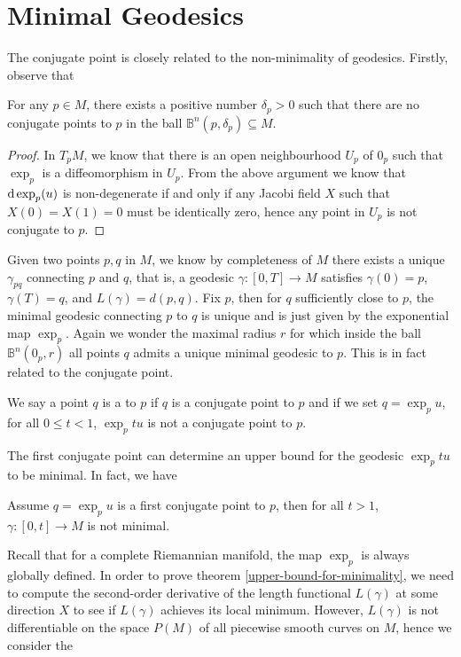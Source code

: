 \section{Minimal Geodesics} The conjugate point is closely related to the non-minimality of geodesics. Firstly, observe that
\begin{prp}
For any $p\in M$, there exists a positive number $\delta_p >0$ such that there are no conjugate points to $p$ in the ball $\mathbb{B}^n (p,\delta_p )\subseteq M$.
\end{prp}
\begin{proof}
In $T_p M$, we know that there is an open neighbourhood $U_p $ of $0_p $ such that $\exp_p $ is a diffeomorphism in $U_p $. From the above argument we know that $\mathrm{d}\exp_p (u)$ is non-degenerate if and only if any Jacobi field $X$ such that $X(0)=X(1)=0$ must be identically zero, hence any point in $U_p $ is not conjugate to $p$.
\end{proof}
Given two points $p,q$ in $M$, we know by completeness of $M$ there exists a unique  $\gamma_{pq} $ connecting $p$ and $q$, that is, a geodesic $\gamma\colon [0,T]\to M$ satisfies $\gamma (0)=p$, $\gamma (T)=q$, and $L(\gamma )=d(p,q)$. Fix $p$, then for $q$ sufficiently close to $p$, the minimal geodesic connecting $p$ to $q$ is unique and is just given by the exponential map $\exp_p $. Again we wonder the maximal radius $r$ for which inside the ball $\mathbb{B}^n (0_p ,r)$ all points $q$ admits a unique minimal geodesic to $p$. This is in fact related to the conjugate point.
\begin{dfn}
We say a point $q$ is a  to $p$ if $q$ is a conjugate point to $p$ and if we set $q=\exp_p u$, for all $0\leq t<1$, $\exp_p tu$ is not a conjugate point to $p$.
\end{dfn}
The first conjugate point can determine an upper bound for the geodesic $\exp_p tu$ to be minimal. In fact, we have
\begin{thr}
    \label{upper-bound-for-minimality} Assume $q=\exp_p u$ is a first conjugate point to $p$, then for all $t>1$, $\gamma\colon [0,t]\to M$ is not minimal.
\end{thr}
Recall that for a complete Riemannian manifold, the map $\exp_p $ is always globally defined. In order to prove theorem \ref{upper-bound-for-minimality}, we need to compute the second-order derivative of the length functional $L(\gamma )$ at some direction $X$ to see if $L(\gamma )$ achieves its local minimum. However, $L(\gamma )$ is not differentiable on the space $P(M)$ of all piecewise smooth curves on $M$, hence we consider the 
